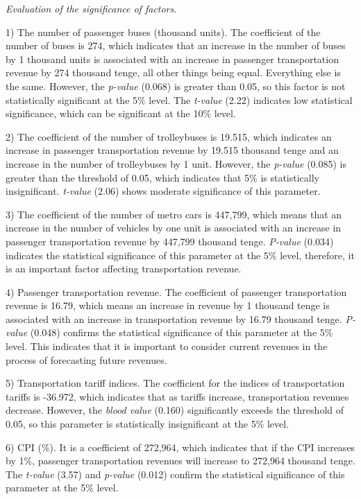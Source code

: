 \begin{multicols}{2}
\emph{Evaluation of the significance of factors}.

1) The number of passenger buses (thousand units). The coefficient of
the number of buses is 274, which indicates that an increase in the
number of buses by 1 thousand units is associated with an increase in
passenger transportation revenue by 274 thousand tenge, all other things
being equal. Everything else is the same. However, the \emph{p-value}
(0.068) is greater than 0.05, so this factor is not statistically
significant at the 5\% level. The \emph{t-value} (2.22) indicates low
statistical significance, which can be significant at the 10\% level.

2) The coefficient of the number of trolleybuses is 19.515, which
indicates an increase in passenger transportation revenue by 19.515
thousand tenge and an increase in the number of trolleybuses by 1 unit.
However, the \emph{p-value} (0.085) is greater than the threshold of
0.05, which indicates that 5\% is statistically insignificant.
\emph{t-value} (2.06) shows moderate significance of this parameter.

3) The coefficient of the number of metro cars is 447,799, which means
that an increase in the number of vehicles by one unit is associated
with an increase in passenger transportation revenue by 447,799 thousand
tenge. \emph{P-value} (0.034) indicates the statistical significance of
this parameter at the 5\% level, therefore, it is an important factor
affecting transportation revenue.

4) Passenger transportation revenue. The coefficient of passenger
transportation revenue is 16.79, which means an increase in revenue by 1
thousand tenge is associated with an increase in transportation revenue
by 16.79 thousand tenge. \emph{P-value} (0.048) confirms the statistical
significance of this parameter at the 5\% level. This indicates that it
is important to consider current revenues in the process of forecasting
future revenues.

5) Transportation tariff indices. The coefficient for the indices of
transportation tariffs is -36.972, which indicates that as tariffs
increase, transportation revenues decrease. However, the \emph{blood
value} (0.160) significantly exceeds the threshold of 0.05, so this
parameter is statistically insignificant at the 5\% level.

6) CPI (\%). It is a coefficient of 272,964, which indicates that if the
CPI increases by 1\%, passenger transportation revenues will increase to
272,964 thousand tenge. The \emph{t-value} (3.57) and \emph{p-value}
(0.012) confirm the statistical significance of this parameter at the
5\% level.


\end{multicols}
